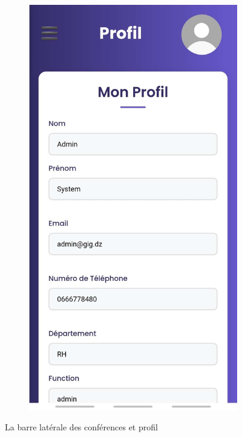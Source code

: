 \documentclass{article}
\begin{document}
\begin{figure}[H]
  \begin{subfigure}[t]{0.3\textwidth}
    \centering
    \includegraphics[width=\textwidth]{picres3.jpg}
    \label{fig:teams-sub}
  \end{subfigure}
  \caption{La barre latérale des conférences et profil}
  \label{fig:teams1}
\end{figure}
\end{document}

